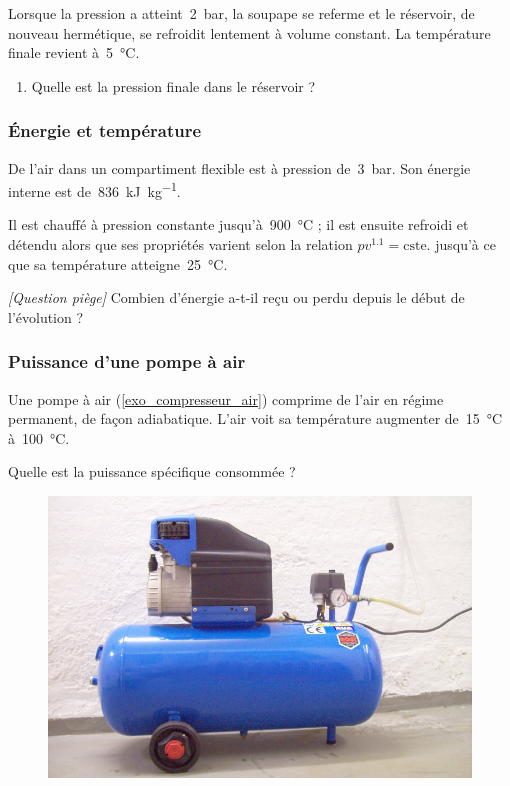 	Lorsque la pression a atteint~\SI{2}{\bar}, la soupape se referme et le réservoir, de nouveau hermétique, se refroidit lentement à volume constant. La température finale revient à~\SI{5}{\degreeCelsius}.
	
	\begin{enumerate}
		\item Quelle est la pression finale dans le réservoir ?
	\end{enumerate}


\subsubsection{Énergie et température}
\label{exo_gp_energie_temperature}

	De l’air dans un compartiment flexible est à pression de~\SI{3}{\bar}. Son énergie interne est de~\SI{836}{\kilo\joule\per\kilogram}.
	
	Il est chauffé à pression constante jusqu’à~\SI{900}{\degreeCelsius} ; il est ensuite refroidi et détendu alors que ses propriétés varient selon la relation $p v^{\num{1.1}} = \text{cste.}$ jusqu’à ce que sa température atteigne~\SI{25}{\degreeCelsius}.

	\textit{[Question piège]} Combien d’énergie a-t-il reçu ou perdu depuis le début de l’évolution ?

\subsubsection{Puissance d’une pompe à air}
\label{exo_puissance_pompe_air}

	Une pompe à air (\cref{exo_compresseur_air}) comprime de l’air en régime permanent, de façon adiabatique. L’air voit sa température augmenter de~\SI{15}{\degreeCelsius} à~\SI{100}{\degreeCelsius}.
	
	Quelle est la puissance spécifique consommée ?

	\begin{figure}[!bh]
		\begin{center}
			\includegraphics[width=0.6\columnwidth]{images/compresseur_air_reservoir.jpg}
		\end{center}
		\label{fig_exo_compresseur_air}
	\end{figure}
	
